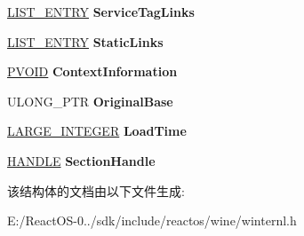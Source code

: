 \begin{DoxyCompactItemize}
\hyperlink{struct___l_i_s_t___e_n_t_r_y}{L\+I\+S\+T\+\_\+\+E\+N\+T\+RY} {\bfseries Service\+Tag\+Links}
\item 
\mbox{\label{struct___l_d_r___m_o_d_u_l_e_af1376191f8b1177548bfb38eab1eee17}} 
\hyperlink{struct___l_i_s_t___e_n_t_r_y}{L\+I\+S\+T\+\_\+\+E\+N\+T\+RY} {\bfseries Static\+Links}
\item 
\mbox{\label{struct___l_d_r___m_o_d_u_l_e_acef322138800cdb8bf7aa8d15ab18313}} 
\hyperlink{interfacevoid}{P\+V\+O\+ID} {\bfseries Context\+Information}
\item 
\mbox{\label{struct___l_d_r___m_o_d_u_l_e_a79a111bc23e51b35fd2196b04993ceba}} 
U\+L\+O\+N\+G\+\_\+\+P\+TR {\bfseries Original\+Base}
\item 
\mbox{\label{struct___l_d_r___m_o_d_u_l_e_a765f307b09819e53621e627105c69730}} 
\hyperlink{union___l_a_r_g_e___i_n_t_e_g_e_r}{L\+A\+R\+G\+E\+\_\+\+I\+N\+T\+E\+G\+ER} {\bfseries Load\+Time}
\item 
\mbox{\label{struct___l_d_r___m_o_d_u_l_e_a41f17ab18ff4fc7f4bde6dab3f5ca4a4}} 
\hyperlink{interfacevoid}{H\+A\+N\+D\+LE} {\bfseries Section\+Handle}
\end{DoxyCompactItemize}


该结构体的文档由以下文件生成\+:\begin{DoxyCompactItemize}
\item 
E\+:/\+React\+O\+S-\/0../sdk/include/reactos/wine/winternl.\+h\end{DoxyCompactItemize}
